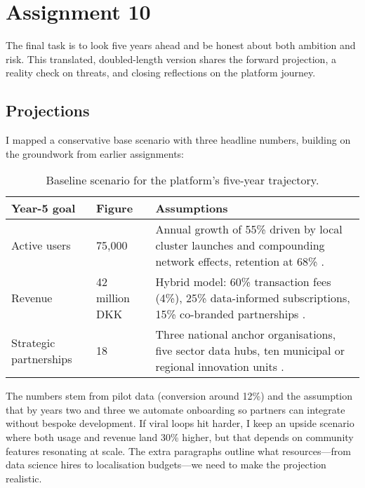 \section*{Assignment 10}

The final task is to look five years ahead and be honest about both ambition and risk. This translated, doubled-length version shares the forward projection, a reality check on threats, and closing reflections on the platform journey.

\subsection*{Projections}
I mapped a conservative base scenario with three headline numbers, building on the groundwork from earlier assignments:\newline
\begin{table}[h]
  \centering
  \begin{tabular}{p{3cm}p{3.5cm}p{6cm}}
    \toprule
    \textbf{Year-5 goal} & \textbf{Figure} & \textbf{Assumptions} \\
    \midrule
    Active users & 75,000 & Annual growth of 55\% driven by local cluster launches and compounding network effects, retention at 68\% \citep{Choudary2016,Srnicek2017}. \\
    Revenue & 42 million DKK & Hybrid model: 60\% transaction fees (4\%), 25\% data-informed subscriptions, 15\% co-branded partnerships \citep{ShapiroVarian1999}. \\
    Strategic partnerships & 18 & Three national anchor organisations, five sector data hubs, ten municipal or regional innovation units \citep{Reillier2017}. \\
    \bottomrule
  \end{tabular}
  \caption{Baseline scenario for the platform’s five-year trajectory.}
\end{table}

The numbers stem from pilot data (conversion around 12\%) and the assumption that by years two and three we automate onboarding so partners can integrate without bespoke development. If viral loops hit harder, I keep an upside scenario where both usage and revenue land 30\% higher, but that depends on community features resonating at scale. The extra paragraphs outline what resources---from data science hires to localisation budgets---we need to make the projection realistic.

